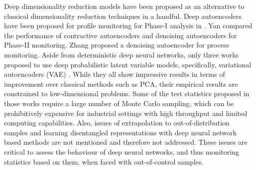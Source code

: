 \documentclass[journal, peerreview]{IEEEtran}
\begin{document}
Deep dimensionality reduction models have been proposed as an alternative to classical dimensionality reduction techniques in a handful.
Deep autoencoders have been proposed for profile monitoring for Phase-I analysis in \cite{Howard2018-op}. 
Yan \etal \cite{Yan2016-wa} compared the performance of contractive autoencoders and denoising autoencoders for Phase-II monitoring. 
Zhang \etal \cite{Zhang2018-js} proposed a denoising autoencoder for process monitoring.
Aside from deterministic deep neural networks, only three works \cite{wang2019systematic, Zhang2019-lu, lee2019process} proposed to use deep probabilistic latent variable models, specifically, variational autoencoders (VAE) \cite{Kingma2013-dl}.
While they all show impressive results in terms of improvement over classical methods such as PCA, their empirical results are constrained to low-dimensional problems.
Some of the test statistics proposed in those works require a large number of Monte Carlo sampling, which can be prohibitively expensive for industrial settings with high throughput and limited computing capabilities.
Also, issues of extrapolation to out-of-distribution samples and learning disentangled representations with deep neural network based methods are not mentioned and therefore not addressed.
These issues are critical to assess the behaviour of deep neural networks, and thus monitoring statistics based on them, when faced with out-of-control samples.
\end{document}
